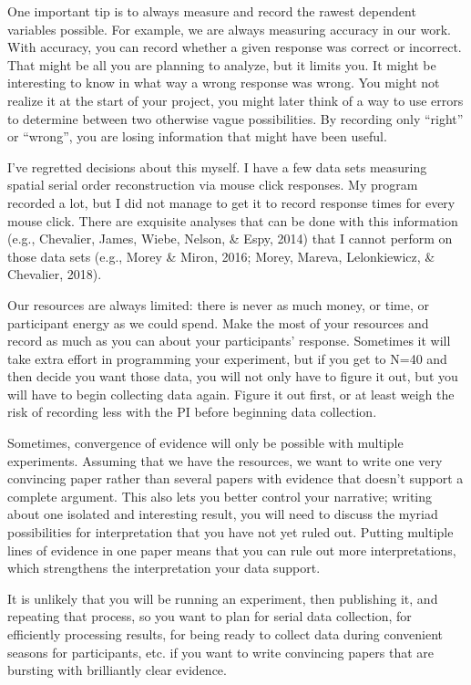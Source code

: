 \documentclass[12pt,]{book}
\theoremstyle{definition}
\theoremstyle{definition}
\theoremstyle{definition}
\theoremstyle{remark}
\begin{document}
One important tip is to always measure and record the rawest dependent
variables possible. For example, we are always measuring accuracy in our
work. With accuracy, you can record whether a given response was correct
or incorrect. That might be all you are planning to analyze, but it
limits you. It might be interesting to know in what way a wrong response
was wrong. You might not realize it at the start of your project, you
might later think of a way to use errors to determine between two
otherwise vague possibilities. By recording only ``right'' or ``wrong'',
you are losing information that might have been useful.

I've regretted decisions about this myself. I have a few data sets
measuring spatial serial order reconstruction via mouse click responses.
My program recorded a lot, but I did not manage to get it to record
response times for every mouse click. There are exquisite analyses that
can be done with this information (e.g., Chevalier, James, Wiebe,
Nelson, \& Espy, 2014) that I cannot perform on those data sets (e.g.,
Morey \& Miron, 2016; Morey, Mareva, Lelonkiewicz, \& Chevalier, 2018).

Our resources are always limited: there is never as much money, or time,
or participant energy as we could spend. Make the most of your resources
and record as much as you can about your participants' response.
Sometimes it will take extra effort in programming your experiment, but
if you get to N=40 and then decide you want those data, you will not
only have to figure it out, but you will have to begin collecting data
again. Figure it out first, or at least weigh the risk of recording less
with the PI before beginning data collection.

Sometimes, convergence of evidence will only be possible with multiple
experiments. Assuming that we have the resources, we want to write one
very convincing paper rather than several papers with evidence that
doesn't support a complete argument. This also lets you better control
your narrative; writing about one isolated and interesting result, you
will need to discuss the myriad possibilities for interpretation that
you have not yet ruled out. Putting multiple lines of evidence in one
paper means that you can rule out more interpretations, which
strengthens the interpretation your data support.

It is unlikely that you will be running an experiment, then publishing
it, and repeating that process, so you want to plan for serial data
collection, for efficiently processing results, for being ready to
collect data during convenient seasons for participants, etc. if you
want to write convincing papers that are bursting with brilliantly clear
evidence.
\end{document}
